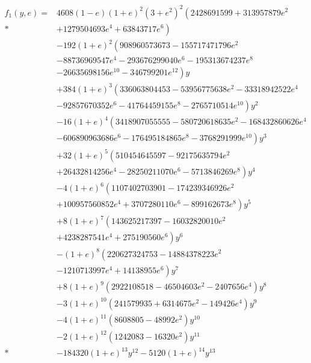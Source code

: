 \begin{align}
f_1(y, e) = {} & 4608 (1 - e) (1 + e)^2 \left(3 + e^2\right)^2 \left(2428691599+313957879 e^2 \right. \nonumber \\*
 {} & + \left. 1279504693 e^4 + 63843717 e^6\right) \nonumber \\ 
 {} & - \left. 192 (1 + e)^2 \left(908960573673 - 155717471796 e^2 \right.\right. \nonumber \\
 {} & - \left. 88736969547 e^4 - 293676299040 e^6 - 195313674237 e^8 \right. \nonumber \\
 {} & - \left. 26635698156 e^{10} - 346799201 e^{12}\right) y \nonumber \\
 {} & + \left. 384 (1+e)^3 \left(336063804453 - 53956775638 e^2 - 33318942522 e^4 \right.\right. \nonumber \\
 {} & - \left. 92857670352 e^6 - 41764459155 e^8 - 2765710514 e^{10}\right) y^2 \nonumber \\
 {} & - \left. 16 (1 + e)^4 \left(3418907055555 - 580720618635 e^2 - 168432860626 e^4 \right.\right. \nonumber \\
 {} & - \left. 606890963686 e^6 - 176495184865 e^8 - 3768291999 e^{10}\right) y^3 \nonumber \\
 {} & + \left. 32 (1 + e)^5 \left(510454645597 - 92175635794 e^2 \right.\right. \nonumber \\
 {} & + \left. 26432814256 e^4 - 28250211070 e^6 - 5713846269 e^8\right) y^4 \nonumber \\
 {} & - \left. 4 (1 + e)^6 \left(1107402703901 - 174239346926 e^2 \right.\right. \nonumber \\
 {} & + \left. 100957560852 e^4 + 3707280110 e^6 - 899162673 e^8\right) y^5 \nonumber \\ 
 {} & + \left. 8 (1 + e)^7 \left(143625217397 - 16032820010 e^2 \right.\right. \nonumber \\
 {} & + \left. 4238287541 e^4 + 275190560 e^6\right) y^6 \nonumber \\
 {} & - \left. (1 + e)^8 \left(220627324753 - 14884378223 e^2 \right.\right. \nonumber \\
 {} & - \left. 1210713997 e^4 + 14138955 e^6\right) y^7 \nonumber \\
 {} & + \left. 8 (1 + e)^9 \left(2922108518 - 46504603 e^2 - 2407656 e^4\right) y^8 \right. \nonumber \\
 {} & - \left. 3 (1 + e)^{10} \left(241579935 + 6314675 e^2 - 149426 e^4\right) y^9 \right. \nonumber \\
 {} & - \left. 4 (1 + e)^{11} \left(8608805 - 48992 e^2\right) y^{10} \right. \nonumber \\
 {} & - \left. 2 (1 + e)^{12} \left(1242083 - 16320 e^2\right) y^{11} \right. \nonumber \\*
 {} & - \left. 184320 (1 + e)^{13} y^{12} - 5120 (1 + e)^{14} y^{13} \right.
\end{align}
